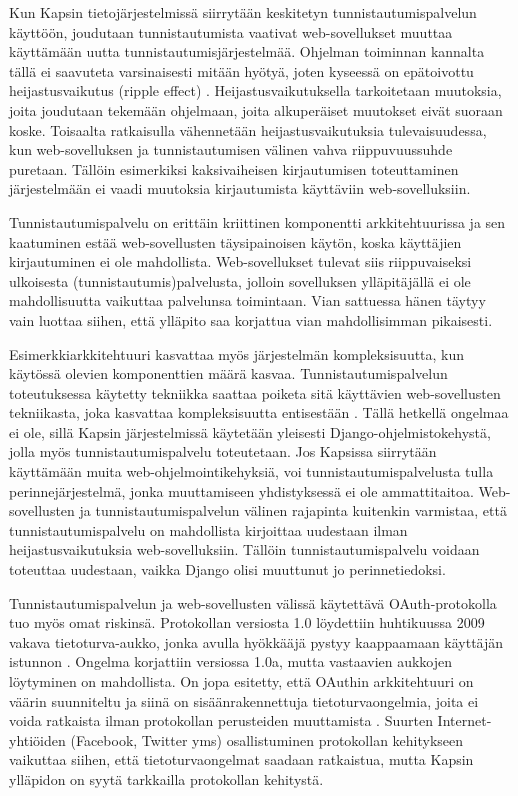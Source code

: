 Kun Kapsin tietojärjestelmissä siirrytään keskitetyn tunnistautumispalvelun käyttöön, joudutaan tunnistautumista vaativat web-sovellukset muuttaa käyttämään uutta tunnistautumisjärjestelmää. Ohjelman toiminnan kannalta tällä ei saavuteta varsinaisesti mitään hyötyä, joten kyseessä on epätoivottu heijastusvaikutus (ripple effect) \cite{arkkitehtuurit}. Heijastusvaikutuksella tarkoitetaan muutoksia, joita joudutaan tekemään ohjelmaan, joita alkuperäiset muutokset eivät suoraan koske. Toisaalta ratkaisulla vähennetään heijastusvaikutuksia tulevaisuudessa, kun web-sovelluksen ja tunnistautumisen välinen vahva riippuvuussuhde puretaan. Tällöin esimerkiksi kaksivaiheisen kirjautumisen toteuttaminen järjestelmään ei vaadi muutoksia kirjautumista käyttäviin web-sovelluksiin.

Tunnistautumispalvelu on erittäin kriittinen komponentti arkkitehtuurissa ja sen kaatuminen estää web-sovellusten täysipainoisen käytön, koska käyttäjien kirjautuminen ei ole mahdollista. Web-sovellukset tulevat siis riippuvaiseksi ulkoisesta (tunnistautumis)palvelusta, jolloin sovelluksen ylläpitäjällä ei ole mahdollisuutta vaikuttaa palvelunsa toimintaan. Vian sattuessa hänen täytyy vain luottaa siihen, että ylläpito saa korjattua vian mahdollisimman pikaisesti.

Esimerkkiarkkitehtuuri kasvattaa myös järjestelmän kompleksisuutta, kun käytössä olevien komponenttien määrä kasvaa. Tunnistautumispalvelun toteutuksessa käytetty tekniikka saattaa poiketa sitä käyttävien web-sovellusten tekniikasta, joka kasvattaa kompleksisuutta entisestään \cite{arkkitehtuurit}. Tällä hetkellä ongelmaa ei ole, sillä Kapsin järjestelmissä käytetään yleisesti Django-ohjelmistokehystä, jolla myös tunnistautumispalvelu toteutetaan. Jos Kapsissa siirrytään käyttämään muita web-oh\-jel\-moin\-ti\-ke\-hyk\-siä, voi tunnistautumispalvelusta tulla perinnejärjestelmä, jonka muuttamiseen yhdistyksessä ei ole ammattitaitoa. Web-sovellusten ja tunnistautumispalvelun välinen rajapinta kuitenkin varmistaa, että tunnistautumispalvelu on mahdollista kirjoittaa uudestaan ilman heijastusvaikutuksia web-sovelluksiin. Tällöin tunnistautumispalvelu voidaan toteuttaa uudestaan, vaikka Django olisi muuttunut jo perinnetiedoksi.

Tunnistautumispalvelun ja web-sovellusten välissä käytettävä OAuth-protokolla tuo myös omat riskinsä. Protokollan versiosta 1.0 löydettiin huhtikuussa 2009 vakava tietoturva-aukko, jonka avulla hyökkääjä pystyy kaappaamaan käyttäjän istunnon \cite{oauth_primer}. Ongelma korjattiin versiossa 1.0a, mutta vastaavien aukkojen löytyminen on mahdollista. On jopa esitetty, että OAuthin arkkitehtuuri on väärin suunniteltu ja siinä on sisäänrakennettuja tietoturvaongelmia, joita ei voida ratkaista ilman protokollan perusteiden muuttamista \cite{oauth_lol}. Suurten Internet-yhtiöiden (Facebook, Twitter yms) osallistuminen protokollan kehitykseen vaikuttaa siihen, että tietoturvaongelmat saadaan ratkaistua, mutta Kapsin ylläpidon on syytä tarkkailla protokollan kehitystä.

